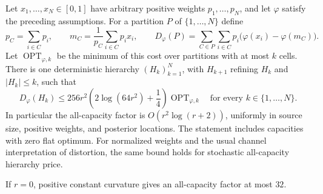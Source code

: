 \begin{theorem}
\label{thm:poly-allcap-new}
Let $x_1,\ldots,x_N\in[0,1]$ have arbitrary positive weights
$p_1,\ldots,p_N$, and let $\varphi$ satisfy the preceding assumptions.
For a partition $P$ of $\{1,\ldots,N\}$ define
\[
 p_C=\sum_{i\in C}p_i,\qquad
 m_C=\frac{1}{p_C}\sum_{i\in C}p_ix_i,\qquad
 D_\varphi(P)=\sum_{C\in P}\sum_{i\in C}
          p_i\bigl(\varphi(x_i)-\varphi(m_C)\bigr).
\]
Let $\operatorname{OPT}_{\varphi,k}$ be the minimum of this cost over
partitions with at most $k$ cells. There is one deterministic hierarchy
$(H_k)_{k=1}^N$, with $H_{k+1}$ refining $H_k$ and $|H_k|\le k$, such that
\begin{equation}
 D_\varphi(H_k)
 \le 256r^2\left(2\log(64r^2)+\frac14\right)
           \operatorname{OPT}_{\varphi,k}
 \quad\text{for every }k\in\{1,\ldots,N\}.
 \label{eq:poly-allcap-new}
\end{equation}
In particular the all-capacity factor is
$O(r^2\log(r+2))$, uniformly in source size, positive weights, and posterior
locations. The statement includes capacities with zero flat optimum.
For normalized weights and the usual channel interpretation of distortion,
the same bound holds for stochastic all-capacity hierarchy price.

If $r=0$, positive constant curvature gives an all-capacity factor at most
$32$.
\end{theorem}


